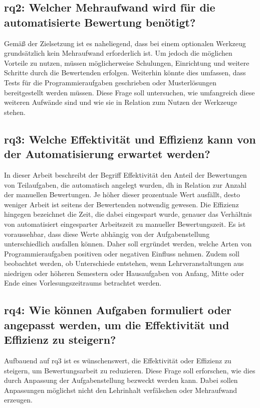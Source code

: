 \subsection[\acs{rq}2]{\ac{rq}2: Welcher Mehraufwand wird für die automatisierte Bewertung benötigt?}\label{subsec:rq2-additional-effort}

Gemäß der Zielsetzung ist es naheliegend, dass bei einem optionalen Werkzeug grundsätzlich kein Mehraufwand erforderlich ist.
Um jedoch die möglichen Vorteile zu nutzen, müssen möglicherweise Schulungen, Einrichtung und weitere Schritte durch die Bewertenden erfolgen.
Weiterhin könnte dies umfassen, dass Tests für die Programmieraufgaben geschrieben oder Musterlösungen bereitgestellt werden müssen.
Diese Frage soll untersuchen, wie umfangreich diese weiteren Aufwände sind und wie sie in Relation zum Nutzen der Werkzeuge stehen.

\subsection[\acs{rq}3]{\ac{rq}3: Welche Effektivität und Effizienz kann von der Automatisierung erwartet werden?}\label{subsec:rq3-effectivity-efficiency}

In dieser Arbeit beschreibt der Begriff Effektivität den Anteil der Bewertungen von Teilaufgaben, die automatisch angelegt wurden, \ac{dh} in Relation zur Anzahl der manuellen Bewertungen.
Je höher dieser prozentuale Wert ausfällt, desto weniger Arbeit ist seitens der Bewertenden notwendig gewesen.
Die Effizienz hingegen bezeichnet die Zeit, die dabei eingespart wurde, genauer das Verhältnis von automatisiert eingesparter Arbeitszeit zu manueller Bewertungszeit.
Es ist voraussehbar, dass diese Werte abhängig von der Aufgabenstellung unterschiedlich ausfallen können.
Daher soll ergründet werden, welche Arten von Programmieraufgaben positiven oder negativen Einfluss nehmen.
Zudem soll beobachtet werden, ob Unterschiede entstehen, wenn Lehrveranstaltungen aus niedrigen oder höheren Semestern oder Hausaufgaben von Anfang, Mitte oder Ende eines Vorlesungszeitraums betrachtet werden.

\subsection[\acs{rq}4]{\ac{rq}4: Wie können Aufgaben formuliert oder angepasst werden, um die Effektivität und Effizienz zu steigern?}\label{subsec:rq4-improve-effectivity-efficiency}

Aufbauend auf \acs{rq}3 ist es wünschenswert, die Effektivität oder Effizienz zu steigern, um Bewertungsarbeit zu reduzieren.
Diese Frage soll erforschen, wie dies durch Anpassung der Aufgabenstellung bezweckt werden kann.
Dabei sollen Anpassungen möglichst nicht den Lehrinhalt verfälschen oder Mehraufwand erzeugen.

